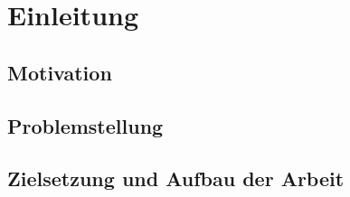 \section{Einleitung}

\subsection{Motivation}

\subsection{Problemstellung}

\subsection{Zielsetzung und Aufbau der Arbeit}
